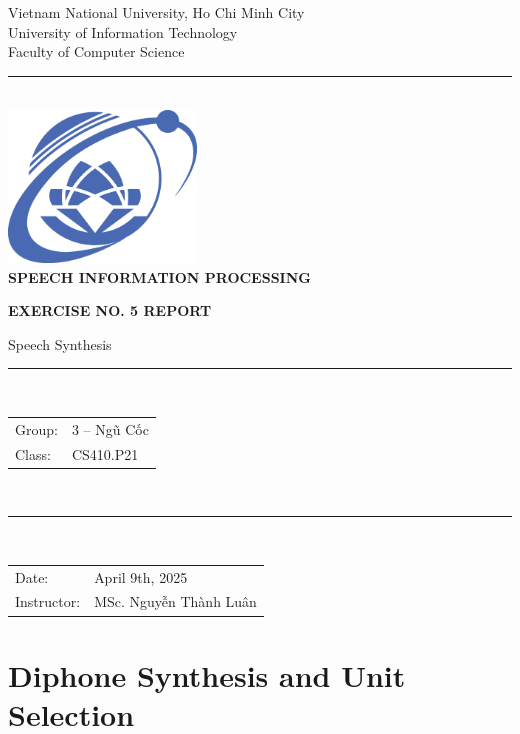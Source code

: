 \documentclass[10pt]{report}
\begin{document}
\begin{titlepage}
	\centering
	\vspace*{0.5cm}
	\LARGE{Vietnam National University, Ho Chi Minh City}\\[-0.2ex]
	\LARGE{University of Information Technology}\\[2.5ex]
	\large{Faculty of Computer Science}\\
	\noindent\rule{\textwidth}{0.2pt}\\
	\vspace{2cm}
	\includegraphics[width=5cm]{assets/uit_logo.eps}\\
	\vspace{2cm}
	\textbf{\LARGE{SPEECH INFORMATION PROCESSING}}
	\medskip\par
	\textbf{\Large{EXERCISE NO. 5 REPORT}}
	\medskip\par
	\Large{Speech Synthesis}\\[-1.5ex]
	\vspace{0.4cm}
	\noindent\rule{0.5\textwidth}{0.2pt}\\
	\vspace{0.4cm}
	\large{
		\begin{tabular}{ll}
			Group: & 3 -- Ngũ Cốc \\[-0.2ex]
			Class: & CS410.P21    \\
		\end{tabular}\\[-0.2ex]}
	\vspace{0.4cm}
	\noindent\rule{0.5\textwidth}{0.2pt}\\
	\vspace{1.6cm}
	\medskip
	\raggedright
	\begin{tabular}{ll}
		Date:       & April 9th, 2025        \\[-0.2ex]
		Instructor: & MSc. Nguyễn Thành Luân \\
	\end{tabular}
\end{titlepage}

\tableofcontents
\newpage

\chapter{Diphone Synthesis and Unit Selection}
\end{document}
